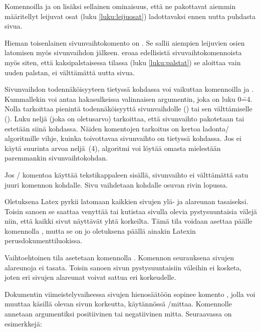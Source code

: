 Komennoilla  ja  on lisäksi
sellainen ominaisuus, että ne pakottavat aiemmin määritellyt leijuvat
osat (luku \ref{luku:leijuosat}) ladottavaksi ennen uutta puhdasta
sivua.

Hieman toisenlainen sivunvaihtokomento on . Se sallii
aiempien leijuvien osien latomisen myös sivunvaihdon jälkeen.
 eroaa edellisistä sivuvaihtokomennoista myös siten,
että kaksipalstaisessa tilassa (luku \ref{luku:palstat}) se aloittaa
vain uuden palstan, ei välttämättä uutta sivua.

Sivunvaihdon todennäköisyyteen tietyssä kohdassa voi vaikuttaa
komennoilla  ja . Kummallekin
voi antaa hakasulkeissa valinnaisen argumentin, joka on luku 0\==4.
Nolla tarkoittaa pienintä todennäköisyyttä sivunvaihdolle
() tai sen välttämiselle
(). Luku neljä (joka on oletusarvo)
tarkoittaa, että sivunvaihto pakotetaan tai estetään siinä kohdassa.
Näiden komentojen tarkoitus on kertoa ladonta\-/ algoritmille vihje,
kuinka toivottavaa sivunvaihto on tietyssä kohdassa. Jos ei käytä
suurinta arvoa neljä~(4), algoritmi voi löytää omasta mielestään
paremmankin sivunvaihtokohdan.

\begin{koodilohkosis}
  \pagebreak[3]  %
  \nopagebreak   %
\end{koodilohkosis}

Jos \-/ komentoa käyttää tekstikappaleen sisällä,
sivunvaihto ei välttämättä satu juuri komennon kohdalle. Sivu vaihdetaan
kohdalle osuvan rivin lopussa.

Oletuksena Latex pyrkii latomaan kaikkien sivujen ylä- ja alareunan
tasaiseksi. Toisin sanoen se saattaa venyttää tai kutistaa sivulla
olevia pystysuuntaisia välejä niin, että kaikki sivut näyttävät yhtä
korkeilta. Tämä tila voidaan asettaa päälle komennolla
, mutta se on jo oletuksena päällä ainakin Latexin
perusdokumenttiluokissa.

Vaihtoehtoinen tila asetetaan komennolla .
Komennon seurauksena sivujen alareunoja ei tasata. Toisin sanoen sivun
pystysuuntaisiin väleihin ei kosketa, joten eri sivujen alareunat voivat
sattua eri korkeudelle.

Dokumentin viimeistelyvaiheessa sivujen hienosäätöön sopinee komento
, jolla voi muuttaa käsillä olevan sivun
korkeutta, käytännössä \-/mittaa. Komennolle annetaan
argumentiksi positiivinen tai negatiivinen mitta. Seuraavassa on
esimerkkejä:

